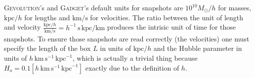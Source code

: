 \textsc{Gevolution}'s and \textsc{Gadget}'s default units for snapshots 
are $10^{10}M_{\odot}/h$ for masses, $\text{kpc}/h$ for lengths
and $\text{km/s}$ for velocities. 
The ratio between the unit of length and velocity
$\frac{\text{kpc}/h}{\text{km/s}} = h^{-1}\,\text{s}\,\text{kpc}/\text{km}$ 
produces the intrisic unit of time for those snapshots.
To ensure those snapshots are read correctly (the velocities) one must specify 
the length of the box $L$ in units of $\text{kpc}/h$ and the Hubble parameter
in units of $h\,\text{km}\,\text{s}^{-1}\,\text{kpc}^{-1}$,
which is actually a trivial thing because 
$H_o = 0.1 [h\,\text{km}\,\text{s}^{-1}\,\text{kpc}^{-1}]$ exactly
due to the definition of $h$.


